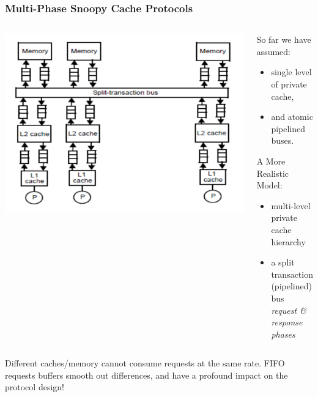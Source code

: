 \documentclass{beamer}
\newcommand{\emp}[1]{\textcolor{DikuRed}{ #1}}
\begin{document}
\begin{frame}[fragile,t]
\frametitle{Multi-Phase Snoopy Cache Protocols}

\begin{columns}\hspace{-8ex}
\includegraphics[width=50ex]{FigsInfCoherence/MultiLevCache}\pause
{}
\begin{scriptsize}
So far we have assumed:
\begin{itemize}
    \item single level of private cache, 
    \item and atomic pipelined buses.
\end{itemize}
\bigskip
\emp{A More Realistic Model:}
\begin{itemize}
    \item \emp{multi-level private cache hierarchy}
    \item \emp{a split transaction (pipelined) bus}\\
            {\em request \& response phases}
\end{itemize}
\end{scriptsize}
\end{columns}
\bigskip

Different caches/memory cannot consume requests at the same rate.
\emp{FIFO requests buffers} smooth out differences, and \emp{have a profound 
impact on the protocol design!}

\end{frame}
\end{document}
